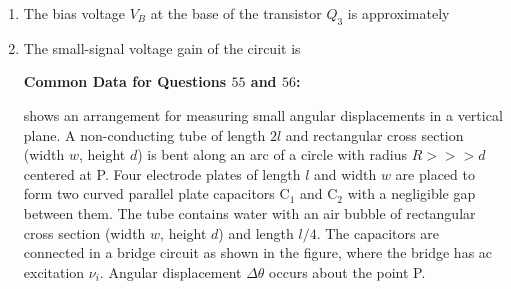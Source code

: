 \documentclass[journal,12pt,onecolumn]{IEEEtran}
\theoremstyle{remark}
\begin{document}
\begin{enumerate}
\item The bias voltage $V_B$ at the base of the transistor $Q_3$ is approximately \par \hfill{}
\begin{enumerate}
\end{enumerate}

 

\item The small-signal voltage gain of the circuit is \par \hfill{}
\begin{enumerate}
\end{enumerate}

 

\textbf{Common Data for Questions $55$ and $56$:}

  shows an arrangement for measuring small angular displacements in a vertical plane. A non-conducting tube of length $2l$ and rectangular cross section (width $w$, height $d$) is bent along an arc of a circle with radius $R>>>d$ centered at P. Four electrode plates of length $l$ and width $w$ are placed to form two curved parallel plate capacitors $\mathrm{C_1}$ and $\mathrm{C_2}$  with a negligible gap between them. The tube contains water with an air bubble of rectangular cross section (width $w$, height $d$) and length $l/4$. The capacitors are connected in a bridge circuit as shown in the figure, where the bridge has ac excitation $\nu_i$. Angular displacement $\Delta\theta$ occurs about the point P.


\end{enumerate}
\end{document}
